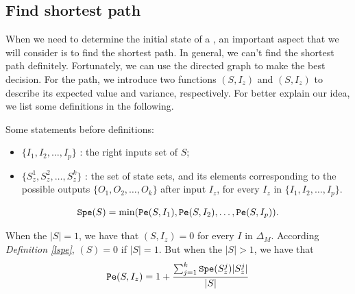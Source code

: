 \subsection{Find shortest path}
When we need to determine the initial state of a \BCN, an important aspect that we will consider is to find the shortest path. In general, we can't find the shortest path definitely.  Fortunately, we can use the directed graph to make the best decision. For the path, we introduce two functions \Pe$(S, I_z)$ and \Pv$(S, I_z)$ to describe its expected value and variance, respectively. For better explain our idea, we list some definitions in the following.



Some statements before definitions:
\begin{itemize}
  \item $\{I_1,I_2,\ldots, I_p\}$ : the right inputs set of $S$;
  \item $\{S_z^1,S_z^2,\ldots, S_z^k\}$ : the set of state sets, and its elements corresponding to the possible outputs $\{O_1,O_2,\ldots,O_k\}$ after input $I_z$, for every $I_z$ in $\{I_1,I_2,\ldots, I_p\}$.
\end{itemize} 
\begin{definition}[\Spe$(S)$] \label{lspe}
 \[{\tt Spe}(S)= \min({\tt Pe}(S, I_1),{\tt Pe}(S, I_2),\ldots,{\tt Pe}(S, I_p)).\] 
\end{definition}

\begin{definition}[\Pe$(S, I_z)$] 
When the $|S|=1$, we have that
\Pe$(S, I_z)=0$  for every $I$ in $\Delta_M$. According {\em Definition \ref{lspe}}, \Spe$(S)=0$ if $|S|=1$. But when the $|S|>1$, 
we have that  
\[{\tt Pe}(S, I_z)=1 +\frac{\sum_{j=1}^k {\tt Spe}(S_z^j)|S_z^j|}{ |S|}\] 
\end{definition}

